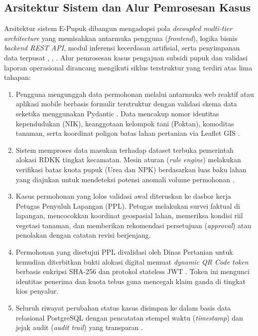﻿\documentclass[conference]{IEEEtran}
\begin{document}
\subsection{Arsitektur Sistem dan Alur Pemrosesan Kasus}
Arsitektur sistem E-Pupuk dibangun mengadopsi pola \textit{decoupled multi-tier architecture} yang memisahkan antarmuka pengguna (\textit{frontend}), logika bisnis \textit{backend REST API}, modul inferensi kecerdasan artifisial, serta penyimpanan data terpusat \cite{b1}, \cite{b14}, \cite{b15}. Alur pemrosesan kasus pengajuan subsidi pupuk dan validasi laporan operasional dirancang mengikuti siklus terstruktur yang terdiri atas lima tahapan:
\begin{enumerate}
    \item Pengguna mengunggah data permohonan melalui antarmuka web reaktif \cite{b14} atau aplikasi mobile berbasis formulir terstruktur dengan validasi skema data seketika menggunakan Pydantic \cite{b18}. Data mencakup nomor identitas kependudukan (NIK), keanggotaan kelompok tani (Poktan), komoditas tanaman, serta koordinat poligon batas lahan pertanian via Leaflet GIS \cite{b16}.
    \item Sistem memproses data masukan terhadap dataset terbuka pemerintah alokasi RDKK tingkat kecamatan. Mesin aturan (\textit{rule engine}) melakukan verifikasi batas kuota pupuk (Urea dan NPK) berdasarkan luas baku lahan yang diajukan untuk mendeteksi potensi anomali volume permohonan \cite{b17}.
    \item Kasus permohonan yang lolos validasi awal diteruskan ke dasbor kerja Petugas Penyuluh Lapangan (PPL). Petugas melakukan survei faktual di lapangan, mencocokkan koordinat geospasial lahan, memeriksa kondisi riil vegetasi tanaman, dan memberikan rekomendasi persetujuan (\textit{approval}) atau penolakan dengan catatan revisi berjenjang.
    \item Permohonan yang disetujui PPL divalidasi oleh Dinas Pertanian untuk kemudian diterbitkan bukti alokasi digital memuat \textit{dynamic QR Code token} berbasis enkripsi SHA-256 dan protokol stateless JWT \cite{b2}. Token ini mengunci identitas penerima dan kuota tebus guna mencegah klaim ganda di tingkat kios penyalur.
    \item Seluruh riwayat perubahan status kasus disimpan ke dalam basis data relasional PostgreSQL dengan pencatatan stempel waktu (\textit{timestamp}) dan jejak audit (\textit{audit trail}) yang transparan \cite{b13}.
\end{enumerate}
\end{document}
